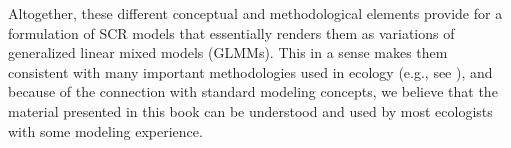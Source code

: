 Altogether, these different conceptual and methodological elements
provide for a formulation of SCR models that essentially renders them
as variations of generalized linear mixed models (GLMMs). This in a
sense makes them consistent with many important methodologies used in
ecology (e.g., see \citet{zuur_etal:2009, kery_etal:2010}), and
because of the connection with standard modeling concepts, we believe
that the material presented in this book can be understood and used by
most ecologists with some modeling experience.

